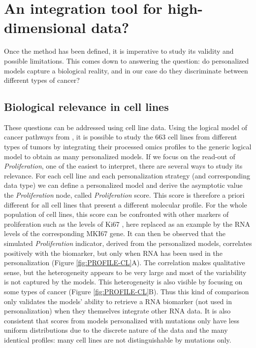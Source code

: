 \documentclass[a4paper,12pt,twoside,onecolumn,openright,final,oldfontcommands]{memoir}
\begin{document}
\section{An integration tool for high-dimensional
data?}\label{an-integration-tool-for-high-dimensional-data}

Once the method has been defined, it is imperative to study its validity
and possible limitations. This comes down to answering the question: do
personalized models capture a biological reality, and in our case do
they discriminate between different types of cancer?

\subsection{Biological relevance in cell lines}\label{PROFILE-CL}

These questions can be addressed using cell line data. Using the logical
model of cancer pathways from \citet{fumia2013boolean}, it is possible
to study the 663 cell lines from different types of tumors by
integrating their processed omics profiles to the generic logical model
to obtain as many personalized models. If we focus on the read-out of
\emph{Proliferation}, one of the easiest to interpret, there are several
ways to study its relevance. For each cell line and each personalization
strategy (and corresponding data type) we can define a personalized
model and derive the asymptotic value the \emph{Proliferation} node,
called \emph{Proliferation} score. This score is therefore a priori
different for all cell lines that present a different molecular profile.
For the whole population of cell lines, this score can be confronted
with other markers of proliferation such as the levels of Ki67
\citep{miller2018ki67}, here replaced as an example by the RNA levels of
the corresponding MKI67 gene. It can then be observed that the simulated
\emph{Proliferation} indicator, derived from the personalized models,
correlates positively with the biomarker, but only when RNA has been
used in the personalization (Figure \ref{fig:PROFILE-CL}A). The
correlation makes qualitative sense, but the heterogeneity appears to be
very large and most of the variability is not captured by the models.
This heterogeneity is also visible by focusing on some types of cancer
(Figure \ref{fig:PROFILE-CL}B). Thus this kind of comparison only
validates the models' ability to retrieve a RNA biomarker (not used in
personalization) when they themselves integrate other RNA data. It is
also consistent that scores from models personalized with mutations only
have less uniform distributions due to the discrete nature of the data
and the many identical profiles: many cell lines are not distinguishable
by mutations only.
\end{document}
